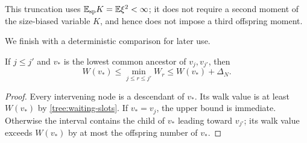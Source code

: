 This truncation uses $\mathbb E_{\mathrm{sp}}K=\mathbb E\xi^2<\infty$; it does not
require a second moment of the size-biased variable $K$, and hence does
not impose a third offspring moment.

We finish with a deterministic comparison for later use.

\begin{lemma}
\label{tree:lca}
If $j\leq j'$ and $v_*$ is the lowest common ancestor of $v_j,v_{j'}$,
then
\begin{equation}
 W(v_*)\leq\min_{j\leq r\leq j'}W_r\leq W(v_*)+\Delta_N.
 \label{tree:lca-walk}
\end{equation}
\end{lemma}
\begin{proof}
Every intervening node is a descendant of $v_*$.  Its walk value is at
least $W(v_*)$ by \eqref{tree:waiting-slots}.  If $v_*=v_j$, the
upper bound is immediate.  Otherwise the interval contains the child of
$v_*$ leading toward $v_{j'}$; its walk value exceeds $W(v_*)$ by at
most the offspring number of $v_*$.
\end{proof}
